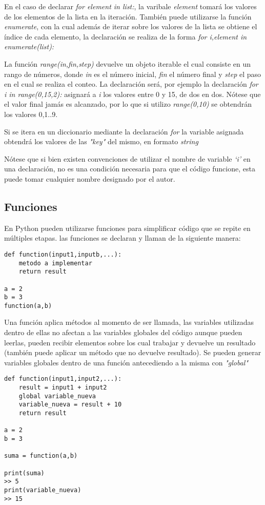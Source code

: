 \documentclass[10pt,a4paper]{article}
\begin{document}
\begin{description}[labelsep=0.5cm, itemindent=0cm]

\item [list]
En el caso de declarar \emph{for element in list:}, la varibale \emph{element} tomará los valores de los elementos de la lista en la iteración. También puede utilizarse la función \emph{enumerate}, con la cual además de iterar sobre los valores de la lista se obtiene el índice de cada elemento, la declaración se realiza de la forma \emph{for i,element in enumerate(list):}  
\item [range(in,fin,step)]
La función \emph{range(in,fin,step)} devuelve un objeto iterable el cual consiste en un rango de números, donde \emph{in} es el número inicial, \emph{fin} el número final y \emph{step} el paso en el cual se realiza el conteo. La declaración será, por ejemplo la declaración \emph{for i in range(0,15,2):} asignará a \emph{i} los valores entre 0 y 15, de dos en dos. Nótese que el valor final jamás es alcanzado, por lo que si utilizo \emph{range(0,10)} se obtendrán los valores 0,1..9.
\item [dictionary]
Si se itera en un diccionario mediante la declaración \emph{for} la variable asignada obtendrá los valores de las \emph{"key"} del mismo, en formato \emph{string}
\end{description}
\noindent Nótese que si bien existen convenciones de utilizar el nombre de variable \emph{`i'} en una declaración, no es una condición necesaria para que el código funcione, esta puede tomar cualquier nombre designado por el autor.
\subsection{Funciones}
En Python pueden utilizarse funciones para simplificar código que se repite en múltiples etapas. las funciones se declaran y llaman de la siguiente manera:
\begin{lstlisting}
def function(input1,inputb,...):
    metodo a implementar
    return result

a = 2
b = 3
function(a,b)
\end{lstlisting} 
\noindent Una función aplica métodos al momento de ser llamada, las variables utilizadas dentro de ellas no afectan a las variables globales del código aunque pueden leerlas, pueden recibir elementos sobre los cual trabajar y devuelve un resultado (también puede aplicar un método que no devuelve resultado). Se pueden generar variables globales dentro de una función antecediendo a la misma con \emph{"global"}
\begin{lstlisting}
def function(input1,input2,...):
    result = input1 + input2
    global variable_nueva
    variable_nueva = result + 10    
    return result

a = 2
b = 3

suma = function(a,b)

print(suma)
>> 5
print(variable_nueva)
>> 15
\end{lstlisting} 
\end{document}
